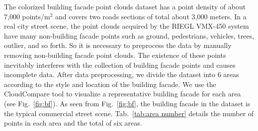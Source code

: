 \documentclass[review]{elsarticle}
\begin{document}
The colorized building facade point clouds dataset has a point density of about 7,000 points/m$^2$ and covers two roads sections of total about 3,000 meters. In a real city street scene, the point clouds acquired by the RIEGL VMX-450 system have many non-building facade points such as ground, pedestrians, vehicles, trees, outlier, and so forth. So it is necessary to preprocess the data by manually removing non-building facade point clouds. The existence of these points inevitably interferes with the collection of building facade points and causes incomplete data. After data preprocessing, we divide the dataset into 6 areas according to the style and location of the building facade. We use the CloudCompare tool to visualize a representative building facade for each area (see Fig.~\ref{fig:bf}). As seen from Fig.~\ref{fig:bf}, the building facade in the dataset is the typical commercial street scene. Tab.~\ref{tab:area number} details the number of points in each area and the total of six areas.

\begin{table}[!htbp] \centering \scriptsize
\end{table}

\begin{table}[!htbp] \centering \scriptsize
\end{table}
\end{document}
